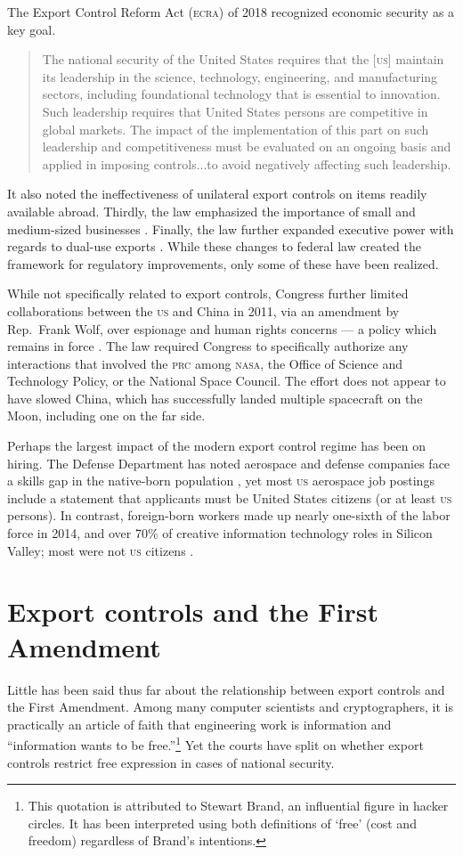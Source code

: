 \documentclass[preprint,twocolumn,5p]{elsarticle}
\begin{document}
The Export Control Reform Act (\textsc{ecra}) of 2018 recognized economic security as a key goal.
\begin{quote}
The national security of the United States requires that the [\textsc{us}] maintain its leadership in the science, technology, engineering, and manufacturing sectors, including foundational technology that is essential to innovation. Such leadership requires that United States persons are competitive in global markets. The impact of the implementation of this part on such leadership and competitiveness must be evaluated on an ongoing basis and applied in imposing controls...to avoid negatively affecting such leadership. \citep[Section 1752(3)]{ECRA2018}
\end{quote} 
It also noted the ineffectiveness of unilateral export controls on items readily available abroad. Thirdly, the law emphasized the importance of small and medium-sized businesses \citep{ECRA2018}. Finally, the law further expanded executive power with regards to dual-use exports \citep{Fergusson2020}. While these changes to federal law created the framework for regulatory improvements, only some of these have been realized.

While not specifically related to export controls, Congress further limited collaborations between the \textsc{us} and China in 2011, via an amendment by Rep.~Frank Wolf, over espionage \citep{Pentland2011} and human rights concerns --- a policy which remains in force \citep{Foust2019}. The law required Congress to specifically authorize any interactions that involved the \textsc{prc} among \textsc{nasa}, the Office of Science and Technology Policy, or the National Space Council. The effort does not appear to have slowed China, which has successfully landed multiple spacecraft on the Moon, including one on the far side.

Perhaps the largest impact of the modern export control regime has been on hiring. The Defense Department has noted aerospace and defense companies face a skills gap in the native-born population \citep{DoD2018}, yet most \textsc{us} aerospace job postings include a statement that applicants must be United States citizens (or at least \textsc{us} persons). In contrast, foreign-born workers made up nearly one-sixth of the labor force in 2014, and over 70\% of creative information technology roles in Silicon Valley; most were not \textsc{us} citizens \citep{Otoiu2017}.

\section{Export controls and the First Amendment}
Little has been said thus far about the relationship between export controls and the First Amendment. Among many computer scientists and cryptographers, it is practically an article of faith that engineering work is information and ``information wants to be free.''\footnote{This quotation is attributed to Stewart Brand, an influential figure in hacker circles. It has been interpreted using both definitions of `free' (cost and freedom) regardless of Brand's intentions.} Yet the courts have split on whether export controls restrict free expression in cases of national security.
\end{document}
